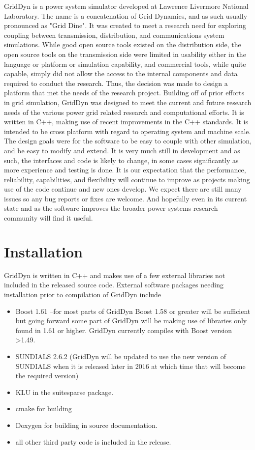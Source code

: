 \documentclass[12pt]{article} %
\begin{document}
GridDyn is a power system simulator developed at Lawrence Livermore National Laboratory. The name is a concatenation of Grid Dynamics, and as such usually pronounced as "Grid Dine". It was created to meet a research need for exploring coupling between transmission, distribution, and communications system simulations.  While good open source tools existed on the distribution side,  the open source tools on the transmission side were limited in usability either in the language or platform or simulation capability, and commercial tools, while quite capable, simply did not allow the access to the internal components and data required to conduct the research.    Thus, the decision was made to design a platform that met the needs of the research project.  Building off of prior efforts in grid simulation, GridDyn was designed to meet the current and future research needs of the various power grid related research and computational efforts.  It is written in C++, making use of recent improvements in the C++ standards.  It is intended to be cross platform with regard to operating system and machine scale.  The design goals were for the software to be easy to couple with other simulation, and be easy to modify and extend.  It is very much still in development and as such, the interfaces and code is likely to change, in some cases significantly as more experience and testing is done.   It is our expectation that the performance, reliability, capabilities, and flexibility will continue to improve as projects making use of the code continue and new ones develop.  We expect there are still many issues so any bug reports or fixes are welcome.    And hopefully even in its current state and as the software improves the broader power systems research community will find it useful.

\section{Installation}
GridDyn is written in C++ and makes use of a few external libraries not included in the released source code.  
External software packages needing installation prior to compilation of GridDyn include
\begin{itemize}
\item Boost 1.61  --for most parts of GridDyn Boost 1.58 or greater will be sufficient but going forward some part of GridDyn will be making use of libraries only found in 1.61 or higher.  GridDyn currently compiles with Boost version >1.49.  
\item SUNDIALS 2.6.2 (GridDyn will be updated to use the new version of SUNDIALS when it is released later in 2016 at which time that will become the required version)
\item KLU in the suitesparse package.  
\item cmake for building
\item Doxygen for building in source documentation.
\item all other third party code is included in the release.  
\end{itemize}
\end{document}
